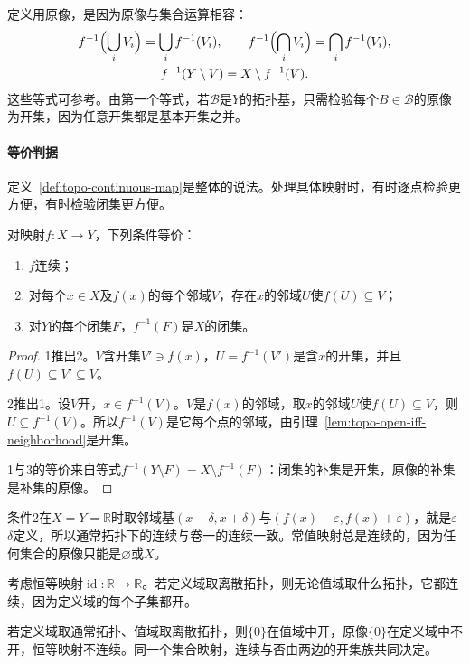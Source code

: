定义用原像，是因为原像与集合运算相容：
\[
\begin{gathered}
 f^{-1}\Bigl(\bigcup_iV_i\Bigr)=\bigcup_if^{-1}(V_i),\qquad
 f^{-1}\Bigl(\bigcap_iV_i\Bigr)=\bigcap_if^{-1}(V_i),\\
 f^{-1}(Y\setminus V)=X\setminus f^{-1}(V).
\end{gathered}
\]
这些等式可参考。由第一个等式，若$\mathcal B$是$Y$的拓扑基，只需检验每个$B\in\mathcal B$的原像为开集，因为任意开集都是基本开集之并。

\paragraph{等价判据}
定义~\ref{def:topo-continuous-map}是整体的说法。处理具体映射时，有时逐点检验更方便，有时检验闭集更方便。

\begin{theorem}[连续性的等价刻画]
\label{thm:topo-continuity-equivalent}
对映射$f:X\to Y$，下列条件等价：
\begin{enumerate}
  \item $f$连续；
  \item 对每个$x\in X$及$f(x)$的每个邻域$V$，存在$x$的邻域$U$使$f(U)\subseteq V$；
  \item 对$Y$的每个闭集$F$，$f^{-1}(F)$是$X$的闭集。
\end{enumerate}
\end{theorem}
\begin{proof}
1推出2。$V$含开集$V'\ni f(x)$，$U=f^{-1}(V')$是含$x$的开集，并且$f(U)\subseteq V'\subseteq V$。

2推出1。设$V$开，$x\in f^{-1}(V)$。$V$是$f(x)$的邻域，取$x$的邻域$U$使$f(U)\subseteq V$，则$U\subseteq f^{-1}(V)$。所以$f^{-1}(V)$是它每个点的邻域，由引理~\ref{lem:topo-open-iff-neighborhood}是开集。

1与3的等价来自等式$f^{-1}(Y\setminus F)=X\setminus f^{-1}(F)$：闭集的补集是开集，原像的补集是补集的原像。
\end{proof}

条件2在$X=Y=\mathbb R$时取邻域基$(x-\delta,x+\delta)$与$(f(x)-\varepsilon,f(x)+\varepsilon)$，就是$\varepsilon$-$\delta$定义，所以通常拓扑下的连续与卷一的连续一致。常值映射总是连续的，因为任何集合的原像只能是$\varnothing$或$X$。

\begin{example}[连续性依赖两边的拓扑]
\label{ex:topo-continuity-depends-topology}
考虑恒等映射$\operatorname{id}:\mathbb R\to\mathbb R$。若定义域取离散拓扑，则无论值域取什么拓扑，它都连续，因为定义域的每个子集都开。

若定义域取通常拓扑、值域取离散拓扑，则$\{0\}$在值域中开，原像$\{0\}$在定义域中不开，恒等映射不连续。同一个集合映射，连续与否由两边的开集族共同决定。
\end{example}


